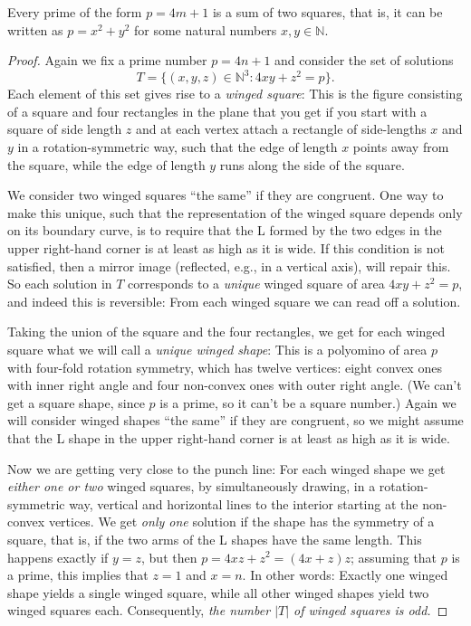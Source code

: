 \begin{proposition}
  \label{ch04.proposition3}
  Every prime of the form \(p = 4m + 1\) is a sum of two squares,
  that is, it can be written as \(p = x^2 + y^2\) for some natural numbers \(x,y \in \mathbb{N}\).
\end{proposition}
\begin{proof}
    Again we fix a prime number $p = 4n + 1$ and consider the set of solutions
\[
T = \{(x, y, z) \in \mathbb{N}^3 : 4xy + z^2 = p\}.
\]
Each element of this set gives rise to a \emph{winged square}: This is the figure consisting of a
square and four rectangles in the plane that you get if you start with a square of side length $z$
and at each vertex attach a rectangle of side-lengths $x$ and $y$ in a rotation-symmetric way,
such that the edge of length $x$ points away from the square, while the edge of length $y$ runs
along the side of the square.

We consider two winged squares ``the same'' if they are congruent. One way to make this unique,
such that the representation of the winged square depends only on its boundary curve, is to require
that the L formed by the two edges in the upper right-hand corner is at least as high as it is wide.
If this condition is not satisfied, then a mirror image (reflected, e.g., in a vertical axis), will
repair this. So each solution in $T$ corresponds to a \emph{unique} winged square of area
$4xy + z^2 = p$, and indeed this is reversible: From each winged square we can read off a solution.

Taking the union of the square and the four rectangles, we get for each winged square what we will
call a \emph{unique winged shape}: This is a polyomino of area $p$ with four-fold rotation symmetry,
 which has twelve vertices: eight convex ones with inner right angle and four non-convex ones with
 outer right angle.
 (We can't get a square shape, since $p$ is a prime, so it can't be a square number.)
 Again we will consider winged shapes ``the same'' if they are congruent, so we might assume that
 the L shape in the upper right-hand corner is at least as high as it is wide.

 Now we are getting very close to the punch line: For each winged shape we get
 \emph{either one or two} winged squares, by simultaneously drawing, in a rotation-symmetric way,
 vertical and horizontal lines to the interior starting at the non-convex vertices. We get
 \emph{only one} solution if the shape has the symmetry of a square, that is, if the two arms of the
 L shapes have the same length. This happens exactly if $y = z$, but then
 $p = 4xz + z^2 = (4x + z)z$; assuming that $p$ is a prime, this implies that $z = 1$ and $x = n$.
 In other words: Exactly one winged shape yields a single winged square, while all other winged
 shapes yield two winged squares each.
 Consequently, \emph{the number $|T|$ of winged squares is odd.}


\end{proof}
